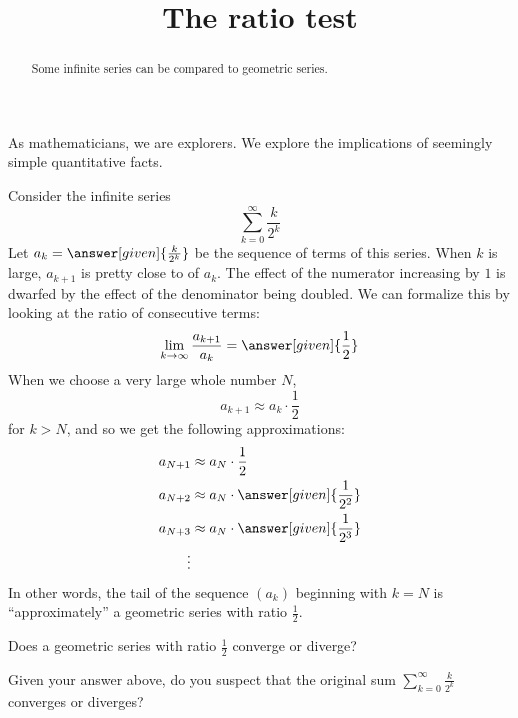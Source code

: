 \documentclass{ximera}
\title[Dig-In:]{The ratio test}
\begin{document}
\begin{abstract}
Some infinite series can be compared to geometric series.
\end{abstract}
\maketitle

As mathematicians, we are explorers. We explore the implications of
seemingly simple quantitative facts. 

\begin{exploration}
Consider the infinite series
\[
\sum_{k=0}^\infty \frac{k}{2^k}
\]
Let $a_k = \answer[given]{\frac{k}{2^k}}$ be the sequence of terms of
this series.  When $k$ is large, $a_{k+1}$ is pretty close to
 of $a_{k}$.  The
effect of the numerator increasing by $1$ is dwarfed by the effect of
the denominator being doubled.  We can formalize this by looking at
the ratio of consecutive terms:
\[
\lim_{k \to \infty} \frac{a_{k+1}}{a_k} = \answer[given]{\frac{1}{2}}
\]
When we choose a very large whole number $N$,
\[
a_{k+1} \approx a_k\cdot \frac{1}{2}
\]
for $k>N$, and so we get the following approximations:
\begin{align*}
  a_{N+1} &\approx a_N\cdot \frac{1}{2} \\
  a_{N+2} &\approx a_N\cdot \answer[given]{\frac{1}{2^2}} \\
  a_{N+3} &\approx a_N\cdot \answer[given]{\frac{1}{2^3}}\\
\vdots
\end{align*}
In other words, the tail of the sequence $(a_k)$ beginning with $k=N$
is ``approximately'' a geometric series with ratio $\frac{1}{2}$.

\begin{question}
Does a geometric series with ratio $\frac{1}{2}$ converge or diverge?
\begin{prompt}
  \begin{multipleChoice}
  \end{multipleChoice}
\end{prompt}
\begin{question}
  Given your answer above, do you suspect that the original sum
  $\sum_{k=0}^\infty \frac{k}{2^k}$ converges or diverges?
  \begin{prompt}
    \begin{multipleChoice}
    \end{multipleChoice}
  \end{prompt}
\end{question}
\end{question}
\end{exploration}
\end{document}
